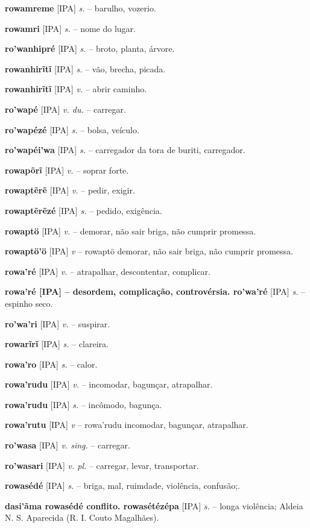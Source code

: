 \textbf{rowamreme} [IPA] \textit{s.} -- barulho, vozerio.

\textbf{rowamri} [IPA] \textit{s.} -- nome do lugar.

\textbf{ro'wanhipré} [IPA] \textit{s.} -- broto, planta, árvore.

\textbf{rowanhirĩtĩ} [IPA] \textit{s.} -- vão, brecha, picada.

\textbf{rowanhirĩtĩ} [IPA] \textit{v.} -- abrir caminho.

\textbf{ro'wapé} [IPA] \textit{v. du.} -- carregar.

\textbf{ro'wapézé} [IPA] \textit{s.} -- bolsa, veículo.

\textbf{ro'wapéi'wa} [IPA] \textit{s.} -- carregador da tora de buriti, carregador.

\textbf{rowapõrĩ} [IPA] \textit{v.} -- soprar forte.

\textbf{rowaptẽrẽ} [IPA] \textit{v.} -- pedir, exigir.

\textbf{rowaptẽrẽzé} [IPA] \textit{s.} -- pedido, exigência.

\textbf{rowaptö} [IPA] \textit{v.} -- demorar, não sair briga, não cumprir promessa.

\textbf{rowaptö'ö} [IPA] \textit{v} -- rowaptö demorar, não sair briga, não cumprir promessa.

\textbf{rowa'ré} [IPA] \textit{v.} -- atrapalhar, descontentar, complicar.

\textbf{rowa'ré [IPA]  -- desordem, complicação, controvérsia. ro'wa'ré} [IPA] \textit{s.} -- espinho seco.

\textbf{ro'wa'ri} [IPA] \textit{v.} -- suspirar.

\textbf{rowarĩrĩ} [IPA] \textit{s.} -- clareira.

\textbf{rowa'ro} [IPA] \textit{s.} -- calor.

\textbf{rowa'rudu} [IPA] \textit{v.} -- incomodar, bagunçar, atrapalhar.

\textbf{rowa'rudu} [IPA] \textit{s.} -- incômodo, bagunça.

\textbf{rowa'rutu} [IPA] \textit{v} -- rowa'rudu incomodar, bagunçar, atrapalhar.

\textbf{ro'wasa} [IPA] \textit{v. sing.} -- carregar.

\textbf{ro'wasari} [IPA] \textit{v. pl.} -- carregar, levar, transportar.

\textbf{rowasédé} [IPA] \textit{s.} -- briga, mal, ruimdade, violência, confusão;.

\textbf{dasi'ãma rowasédé conflito. rowasétézépa} [IPA] \textit{s.} -- longa violência; Aldeia N. S. Aparecida (R. I. Couto Magalhães).

